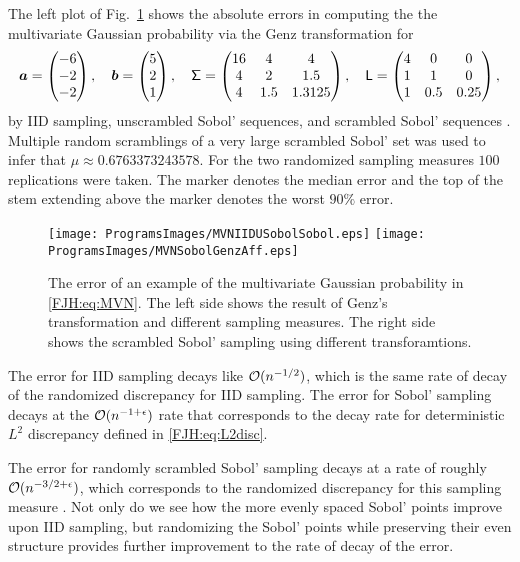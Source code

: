 \documentclass[graybox,footinfo]{svmult}
\begin{document}
The left plot of Fig.\ \ref{FJH:fig:MVNfig} shows the absolute errors in computing the the 
multivariate 
Gaussian probability via the Genz transformation for 
\[
   {\boldsymbol{a}}  = \begin{pmatrix}
   -6 \\ -2 \\ -2
   \end{pmatrix}, \quad
      {\boldsymbol{b}}  = \begin{pmatrix}
   5 \\ 2 \\ 1
   \end{pmatrix}, \quad
   \mathsf{\Sigma} = \begin{pmatrix} 16 & 4 & 4 \\ 4 &  2 &  1.5 \\
  4 & 1.5 &  1.3125 \end{pmatrix}, \quad
   \mathsf{L} = \begin{pmatrix} 4 & 0 & 0 \\ 1 &  1 &  0 \\
1 & 0.5 &  0.25 \end{pmatrix}, 
\]
by IID sampling, unscrambled Sobol' sequences, and scrambled Sobol' sequences 
\cite{??}.   
Multiple random scramblings of a very large scrambled Sobol' set was used to infer that 
$\mu \approx 0.6763373243578$.   For the two randomized sampling measures $100$ 
replications were taken.  The marker denotes the median error and the top of the stem 
extending above the marker denotes the worst $90\%$ error.

\begin{figure}
	\centering
	\texttt{[image: ProgramsImages/MVNIIDUSobolSobol.eps]} 
	\qquad 
	\texttt{[image: ProgramsImages/MVNSobolGenzAff.eps]}
	\caption{The error of an example of the multivariate Gaussian probability in 
	\eqref{FJH:eq:MVN}.  The left side shows the result of Genz's transformation and 
	different sampling measures.  The right side shows the scrambled Sobol' sampling 
	using different transforamtions.
	\label{FJH:fig:MVNfig}}
\end{figure}

The error for IID sampling decays like $\mathcal{O}(n^{-1/2})$, which is the same rate of 
decay of the randomized discrepancy for IID sampling.  The error for  Sobol' sampling 
decays at the $\mathcal{O}(n^{-1+\epsilon})$ rate that corresponds to the decay rate for 
deterministic $L^2$
discrepancy defined in \eqref{FJH:eq:L2disc}.  

The error for randomly scrambled Sobol' 
sampling decays at a rate of roughly $\mathcal{O}(n^{-3/2+\epsilon})$, which corresponds to 
the randomized discrepancy for this sampling measure \cite{???}.  Not only do we 
see how the more evenly spaced Sobol' points improve upon IID sampling, but 
randomizing the Sobol' points while preserving their even structure provides further 
improvement to the rate of decay of the error.
\end{document}
